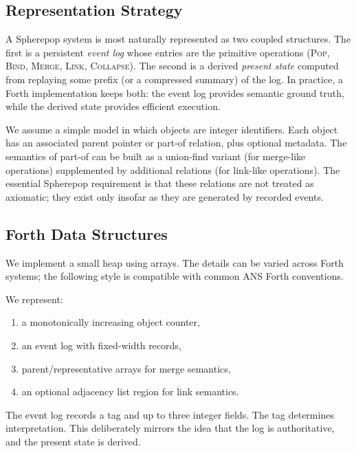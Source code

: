 \documentclass[11pt]{article}
\begin{document}
\subsection{Representation Strategy}

A Spherepop system is most naturally represented as two coupled structures. The
first is a persistent \emph{event log} whose entries are the primitive operations
(\textsc{Pop}, \textsc{Bind}, \textsc{Merge}, \textsc{Link}, \textsc{Collapse}).
The second is a derived \emph{present state} computed from replaying some prefix
(or a compressed summary) of the log. In practice, a Forth implementation keeps
both: the event log provides semantic ground truth, while the derived state
provides efficient execution.

We assume a simple model in which objects are integer identifiers. Each object
has an associated parent pointer or part-of relation, plus optional metadata.
The semantics of part-of can be built as a union-find variant (for merge-like
operations) supplemented by additional relations (for link-like operations).
The essential Spherepop requirement is that these relations are not treated as
axiomatic; they exist only insofar as they are generated by recorded events.

\subsection{Forth Data Structures}

We implement a small heap using arrays. The details can be varied across Forth
systems; the following style is compatible with common ANS Forth conventions.

We represent:
\begin{enumerate}
\item a monotonically increasing object counter,
\item an event log with fixed-width records,
\item parent/representative arrays for merge semantics,
\item an optional adjacency list region for link semantics.
\end{enumerate}

The event log records a tag and up to three integer fields. The tag determines
interpretation. This deliberately mirrors the idea that the log is authoritative,
and the present state is derived.
\end{document}
